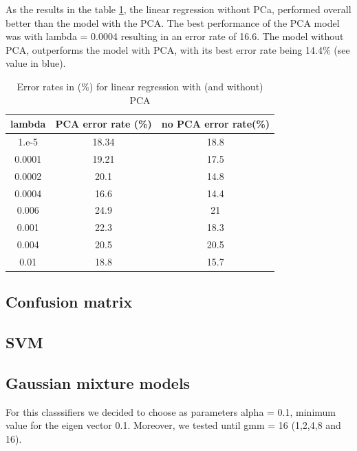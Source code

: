 \documentclass[twoside,a4paper,12pt]{report}
\begin{document}
As the results in the table \ref{errorRateslinearregression}, the linear regression
without PCa, performed overall better than the model with the PCA.
The best performance of the PCA model was with lambda = 0.0004 
resulting in an error rate of 16.6. The model without PCA, outperforms the model 
with PCA, with its best error rate being 14.4\% (see value in blue).

\begin{table}
    \centering
     \begin{tabular}{||c c c ||} 
        \hline \hline
        lambda & PCA error rate (\%) & no PCA error rate(\%)\\
        \hline\hline
        1.e-5  & 18.34  & 18.8   \\ 
        \hline
        0.0001 & 19.21  &  17.5  \\ 
        \hline
        0.0002 & 20.1  &  14.8  \\ 
        \hline
        0.0004 & 16.6  &  \cellcolor{blue!25}  14.4  \\ 
        \hline
        0.006  & 24.9  & 21    \\ 
        \hline
        0.001  & 22.3  &  18.3  \\ 
        \hline
        0.004 & 20.5  &  20.5  \\ 
        \hline
        0.01  &  18.8 & 15.7   \\ 
        \hline \hline
    \end{tabular}
    \label{errorRateslinearregression}
    \caption{Error rates in (\%) for linear regression with (and without) PCA}
    \end{table}


\subsection{Confusion matrix}



\subsection{SVM}

\subsection{Gaussian mixture models}
For this classsifiers we decided to choose as parameters alpha = 0.1, minimum value
for the eigen vector 0.1. Moreover, we tested until gmm = 16 (1,2,4,8 and 16).
\end{document}
